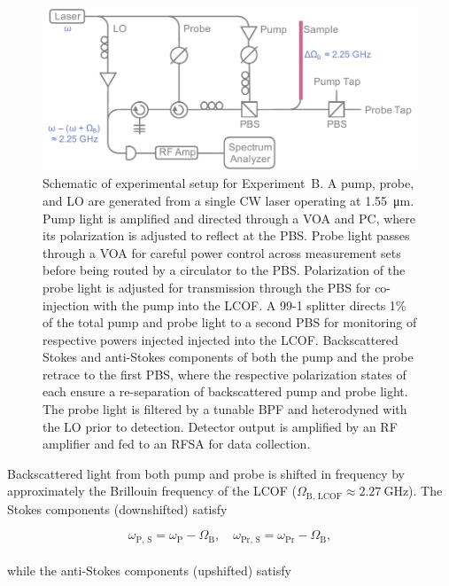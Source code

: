 \begin{figure}[t]
  \centering
  \includegraphics[width=\textwidth]{figs/3-Cooling/pumpProbeDesign.pdf}
  \caption{Schematic of experimental setup for Experiment~B. A pump, probe, and \ac{LO} are generated from a single \ac{CW} laser operating at \SI{1.55}{\micro\meter}. Pump light is amplified and directed through a \ac{VOA} and \ac{PC}, where its polarization is adjusted to reflect at the \ac{PBS}. Probe light passes through a \ac{VOA} for careful power control across measurement sets before being routed by a circulator to the \ac{PBS}. Polarization of the probe light is adjusted for transmission through the \ac{PBS} for co-injection with the pump into the \ac{LCOF}. A 99-1 splitter directs 1\% of the total pump and probe light to a second \ac{PBS} for monitoring of respective powers injected injected into the \ac{LCOF}. Backscattered Stokes and anti-Stokes components of both the pump and the probe retrace to the first \ac{PBS}, where the respective polarization states of each ensure a re-separation of backscattered pump and probe light. The probe light is filtered by a tunable \ac{BPF} and heterodyned with the \ac{LO} prior to detection. Detector output is amplified by an \ac{RF} amplifier and fed to an \ac{RFSA} for data collection.}
  \label{fig:Cooling:ExperimentBDesign}
\end{figure}

Backscattered light from both pump and probe is shifted in frequency by approximately the Brillouin frequency of the \ac{LCOF} (\(\Omega_{\mathrm{B,\,LCOF}} \approx \SI{2.27}{\giga\hertz}\)). The Stokes components (downshifted) satisfy

\begin{equation}
\omega_{\mathrm{P,\,S}} = \omega_{\mathrm{P}} - \Omega_{\mathrm{B}},
\quad
\omega_{\mathrm{Pr,\,S}} = \omega_{\mathrm{Pr}} - \Omega_{\mathrm{B}},
\end{equation}
\\
while the anti-Stokes components (upshifted) satisfy

